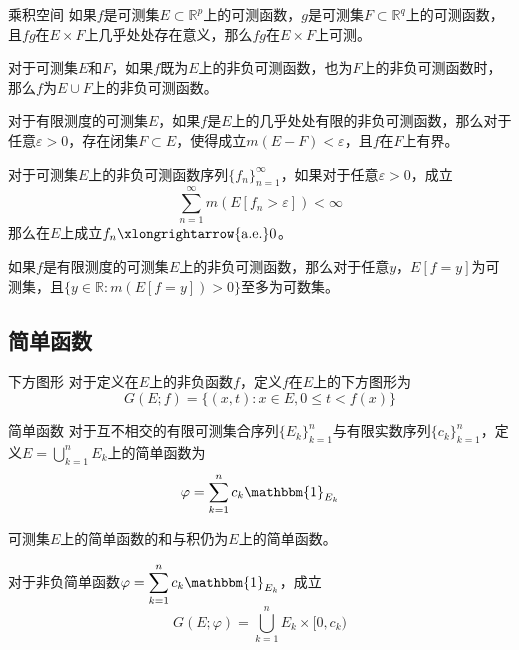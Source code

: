 \documentclass[lang = cn, scheme = chinese, thmcnt = section]{elegantbook}
\newcommand{\R}{\mathbb{R}}            %
\newcommand{\sub}{\subset}             %
\newcommand{\dis}{\displaystyle}
\newcommand{\toae}{\xlongrightarrow{\mathrm{a.e.}}}
\begin{document}
\begin{theorem}{乘积空间}
	如果$f$是可测集$E\sub\R^p$上的可测函数，$g$是可测集$F\sub\R^q$上的可测函数，且$fg$在$E\times F$上几乎处处存在意义，那么$fg$在$E\times F$上可测。
\end{theorem}

\begin{exercise}
	对于可测集$E$和$F$，如果$f$既为$E$上的非负可测函数，也为$F$上的非负可测函数时，那么$f$为$E\cup F$上的非负可测函数。
\end{exercise}

\begin{exercise}
	对于有限测度的可测集$E$，如果$f$是$E$上的几乎处处有限的非负可测函数，那么对于任意$\varepsilon>0$，存在闭集$F\sub E$，使得成立$m(E-F)<\varepsilon$，且$f$在$F$上有界。
\end{exercise}

\begin{exercise}
	对于可测集$E$上的非负可测函数序列$\{f_n\}_{n=1}^{\infty}$，如果对于任意$\varepsilon>0$，成立
	$$
	\sum_{n=1}^{\infty}{m(E[f_n>\varepsilon])}<\infty
	$$
	那么在$E$上成立$f_n\toae 0$。
\end{exercise}

\begin{exercise}
	如果$f$是有限测度的可测集$E$上的非负可测函数，那么对于任意$y$，$E[f=y]$为可测集，且$\{ y\in\R:m(E[f=y])>0 \}$至多为可数集。
\end{exercise}

\subsection{简单函数}

\begin{definition}{下方图形}
	对于定义在$E$上的非负函数$f$，定义$f$在$E$上的下方图形为
	$$
	G(E;f)=\{ (x,t):x\in E,0\le t<f(x) \}
	$$
\end{definition}

\begin{definition}{简单函数}
	对于互不相交的有限可测集合序列$\{E_k\}_{k=1}^{n}$与有限实数序列$\{c_k\}_{k=1}^{n}$，定义$\dis E=\bigcup_{k=1}^{n}{E_k}$上的简单函数为
	$$
	\varphi=\sum_{k=1}^{n}{c_k\mathbbm{1}_{E_k}}
	$$
\end{definition}

\begin{proposition}
	可测集$E$上的简单函数的和与积仍为$E$上的简单函数。
\end{proposition}

\begin{proposition}
	对于非负简单函数$\dis \varphi=\sum_{k=1}^{n}{c_k\mathbbm{1}_{E_k}}$，成立
	$$
	G(E;\varphi)=\bigcup_{k=1}^{n}{E_k\times[0,c_k)}
	$$
\end{proposition}
\end{document}

